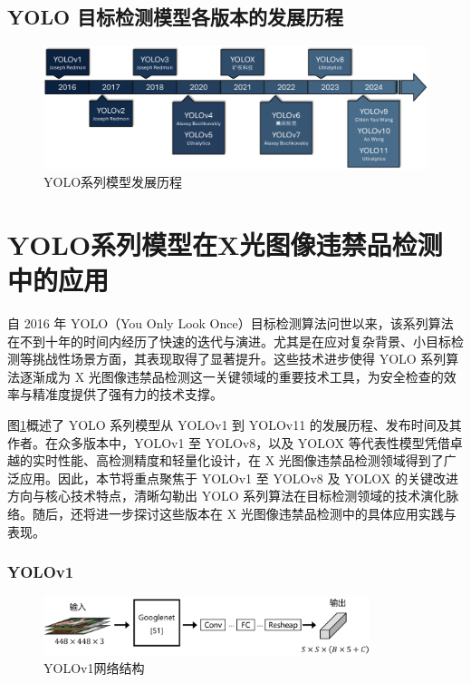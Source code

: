 \documentclass[11pt,twocolumn]{ctexart}
\begin{document}
\subsection{YOLO 目标检测模型各版本的发展历程}

\begin{figure}[!htbp]
  \begin{center}
    \includegraphics[width=\textwidth]{发展流程图}
    \end{center}
  \caption{YOLO系列模型发展历程}
  \label{发展流程}
\end{figure}

\section{YOLO系列模型在X光图像违禁品检测中的应用}

自 2016 年 YOLO（You Only Look Once）目标检测算法问世以来，该系列算法在不到十年的时间内经历了快速的迭代与演进。尤其是在应对复杂背景、小目标检测等挑战性场景方面，其表现取得了显著提升。这些技术进步使得 YOLO 系列算法逐渐成为 X 光图像违禁品检测这一关键领域的重要技术工具，为安全检查的效率与精准度提供了强有力的技术支撑。

图\ref{发展流程}概述了 YOLO 系列模型从 YOLOv1 到 YOLOv11 的发展历程、发布时间及其作者。在众多版本中，YOLOv1 至 YOLOv8，以及 YOLOX 等代表性模型凭借卓越的实时性能、高检测精度和轻量化设计，在 X 光图像违禁品检测领域得到了广泛应用。因此，本节将重点聚焦于 YOLOv1 至 YOLOv8 及 YOLOX 的关键改进方向与核心技术特点，清晰勾勒出 YOLO 系列算法在目标检测领域的技术演化脉络。随后，还将进一步探讨这些版本在 X 光图像违禁品检测中的具体应用实践与表现。




\subsubsection{YOLOv1}

\begin{figure}[!hbtp]
  \begin{center}
  \includegraphics[width=0.85\textwidth]{YOLOv1结构图}
    \end{center}
  \caption{YOLOv1网络结构}
  \label{YOLOV1网络结构}
\end{figure}
\end{document}
